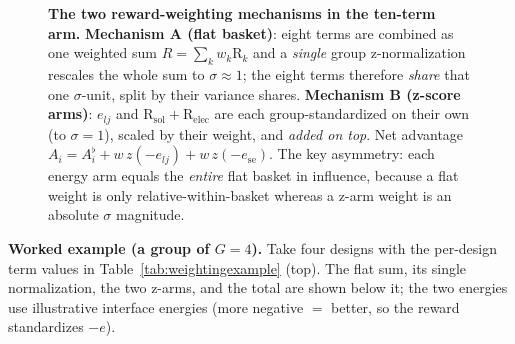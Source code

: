 \documentclass[11pt]{article}
\newcommand{\R}{\mathrm{R}}
\begin{document}
\begin{figure}[htbp]
{%
}
\caption{\textbf{The two reward-weighting mechanisms in the ten-term arm.}
\textcolor{lfLine}{\textbf{Mechanism A (flat basket)}}: eight terms are combined as one weighted sum
$R=\sum_k w_k\R_k$ and a \emph{single} group z-normalization rescales the whole sum to
$\sigma\!\approx\!1$; the eight terms therefore \emph{share} that one $\sigma$-unit, split by their
variance shares. \textcolor{aLine}{\textbf{Mechanism B (z-score arms)}}: $e_{lj}$ and
$\R_{\mathrm{sol}}{+}\R_{\mathrm{elec}}$ are each group-standardized on their own (to $\sigma\!=\!1$),
scaled by their weight, and \emph{added on top}. Net advantage $A_i=A^{\flat}_i+w\,z(-e_{lj})+w\,z(-e_{\mathrm{se}})$.
The key asymmetry: each energy arm equals the \emph{entire} flat basket in influence, because a flat
weight is only relative-within-basket whereas a z-arm weight is an absolute $\sigma$ magnitude.}
\label{fig:reward-weighting}
\end{figure}

\textbf{Worked example (a group of $G=4$).} Take four designs with the per-design term values in
Table~\ref{tab:weightingexample} (top). The flat sum, its single normalization, the two z-arms, and
the total are shown below it; the two energies use illustrative interface energies (more negative $=$
better, so the reward standardizes $-e$).
\end{document}

